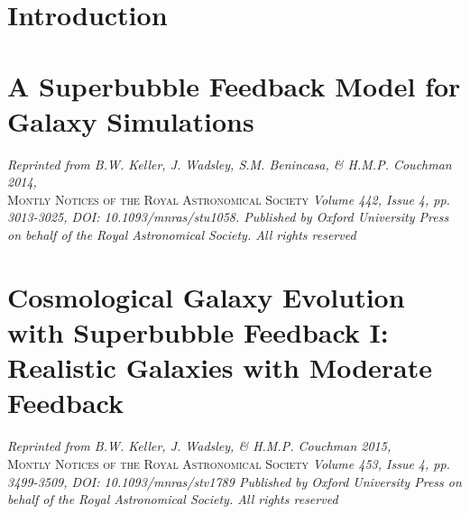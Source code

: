 \documentclass[letterpaper,12pt,twoside,openright]{report} %
\begin{document}
    \setcounter{secnumdepth}{3} %
    \tableofcontents %
    \cleardoublepage
    \listoffigures 
    \let\cleardoublepage\clearpage %
    \cleardoublepage
    \listoftables 
    \let\cleardoublepage\clearpage


    \pagestyle{fancy}
    \fancyhead{}
    \fancyfoot{}
    \fancyfoot[CE,CO]{\thepage}



\chapter{Introduction}
\thispagestyle{fancy}

\chapter{A Superbubble Feedback Model for Galaxy Simulations}
\thispagestyle{fancy}
\textit{Reprinted from B.W. Keller, J. Wadsley, S.M. Benincasa, \& H.M.P.
Couchman 2014,} \\ \textsc{Montly Notices of the Royal Astronomical Society}
\textit{Volume 442, Issue 4, pp. 3013-3025, DOI: 10.1093/mnras/stu1058.
Published by Oxford University Press on behalf of the Royal Astronomical
Society.  All rights reserved}

\chapter{Cosmological Galaxy Evolution with Superbubble Feedback I: Realistic
Galaxies with Moderate Feedback}
\thispagestyle{fancy}
\textit{Reprinted from B.W. Keller, J. Wadsley, \& H.M.P.
Couchman 2015,} \\ \textsc{Montly Notices of the Royal Astronomical Society}
\textit{Volume 453, Issue 4, pp. 3499-3509, DOI: 10.1093/mnras/stv1789
Published by Oxford University Press on behalf of the Royal Astronomical
Society.  All rights reserved}

\end{document}
